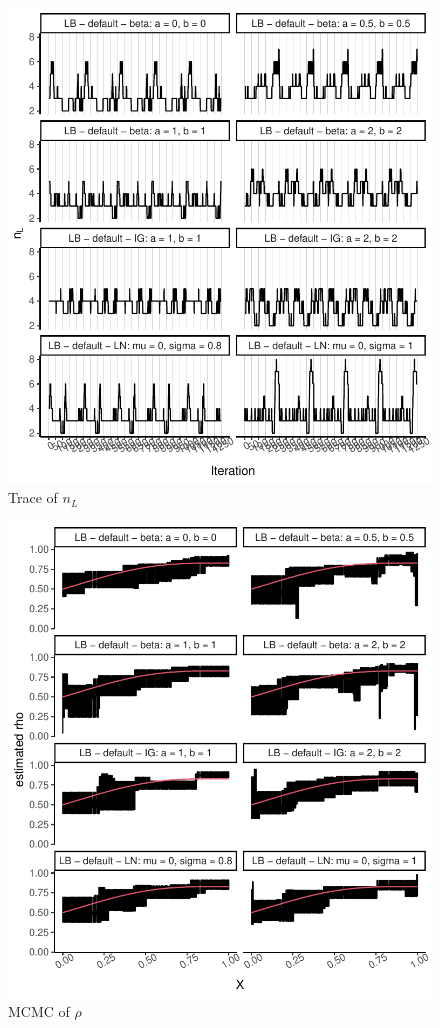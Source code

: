 \documentclass{amsart}
\begin{document}
\begin{figure}[ht]
	\centering
	\includegraphics[width=0.95\linewidth]{trace_nl_2.pdf}
	\caption{Trace of $n_L$}
	\label{fig:trace:nl:2}
\end{figure}
\iffalse
\begin{figure}[ht]
	\centering
	\includegraphics[width=0.95\linewidth]{mcmc_rho_2.pdf}
	\caption{MCMC of $\rho$}
	\label{fig:mcmc:rho:2}
\end{figure}
\end{document}
